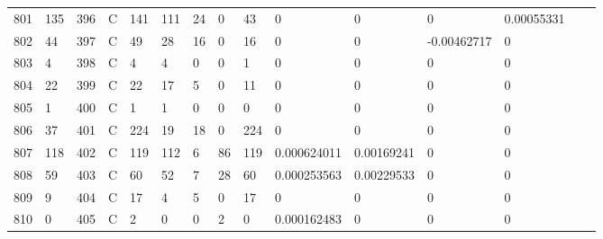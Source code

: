 \begin{longtable}{lllllllllllllll}
	801 & 135               & 396 & C   & 141               & 111               & 24                & 0    & 43         & 0              & 0              & 0             & 0.00055331   \\
	802 & 44                & 397 & C   & 49                & 28                & 16                & 0    & 16         & 0              & 0              & -0.00462717   & 0            \\
	803 & 4                 & 398 & C   & 4                 & 4                 & 0                 & 0    & 1          & 0              & 0              & 0             & 0            \\
	804 & 22                & 399 & C   & 22                & 17                & 5                 & 0    & 11         & 0              & 0              & 0             & 0            \\
	805 & 1                 & 400 & C   & 1                 & 1                 & 0                 & 0    & 0          & 0              & 0              & 0             & 0            \\
	806 & 37                & 401 & C   & 224               & 19                & 18                & 0    & 224        & 0              & 0              & 0             & 0            \\
	807 & 118               & 402 & C   & 119               & 112               & 6                 & 86   & 119        & 0.000624011    & 0.00169241     & 0             & 0            \\
	808 & 59                & 403 & C   & 60                & 52                & 7                 & 28   & 60         & 0.000253563    & 0.00229533     & 0             & 0            \\
	809 & 9                 & 404 & C   & 17                & 4                 & 5                 & 0    & 17         & 0              & 0              & 0             & 0            \\
	810 & 0                 & 405 & C   & 2                 & 0                 & 0                 & 2    & 0          & 0.000162483    & 0              & 0             & 0           
\end{longtable}